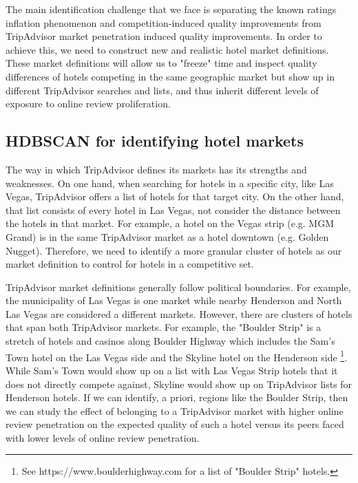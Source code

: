 \documentclass[mksc,blindrev]{informs3} %
\begin{document}
The main identification challenge that we face is separating the known ratings inflation phenomenon and competition-induced quality improvements from TripAdvisor market penetration induced quality improvements. In order to achieve this, we need to construct new and realistic hotel market definitions. These market definitions will allow us to "freeze" time and inspect quality differences of hotels competing in the same geographic market but show up in different TripAdvisor searches and lists, and thus inherit different levels of exposure to online review proliferation.

\subsection{HDBSCAN for identifying hotel markets}\label{sec:hdbscan}

The way in which TripAdvisor defines its markets has its strengths and weaknesses. On one hand, when searching for hotels in a specific city, like Las Vegas, TripAdvisor offers a list of hotels for that target city. On the other hand, that list consists of every hotel in Las Vegas, not consider the distance between the hotels in that market. For example, a hotel on the Vegas strip (e.g. MGM Grand) is in the same TripAdvisor market as a hotel downtown (e.g. Golden Nugget). Therefore, we need to identify a more granular cluster of hotels as our market definition to control for hotels in a competitive set.

TripAdvisor market definitions generally follow political boundaries. For example, the municipality of Las Vegas is one market while nearby Henderson and North Las Vegas are considered a different markets. However, there are clusters of hotels that span both TripAdvisor markets. For example, the "Boulder Strip" is a stretch of hotels and casinos along Boulder Highway which includes the Sam's Town hotel on the Las Vegas side and the Skyline hotel on the Henderson side \footnote{See https://www.boulderhighway.com for a list of "Boulder Strip" hotels.}. While Sam's Town would show up on a list with Las Vegas Strip hotels that it does not directly compete against, Skyline would show up on TripAdvisor lists for Henderson hotels. If we can identify, a priori, regions like the Boulder Strip, then we can study the effect of belonging to a TripAdvisor market with higher online review penetration on the expected quality of such a hotel versus its peers faced with lower levels of online review penetration.
\end{document}
